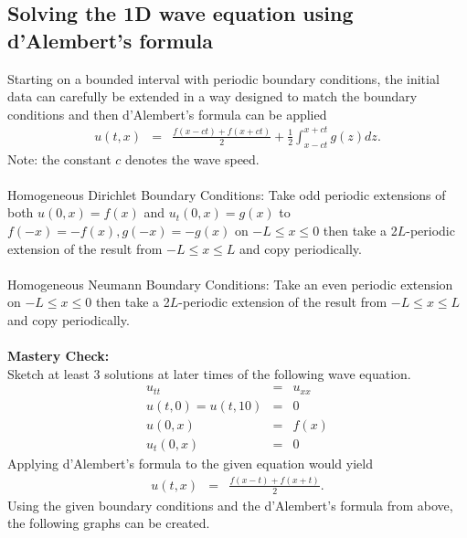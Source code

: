 \documentclass{article}
\newcommand{\bea}{\begin{eqnarray*}}
\newcommand{\eea}{\end{eqnarray*}}
\begin{document}
\subsection{Solving the 1D wave equation using d'Alembert's formula}
Starting on a bounded interval with periodic boundary conditions, the initial data can carefully be extended in a way designed to match the boundary conditions and then d'Alembert's formula can be applied
\bea
u(t,x) &=& \frac{f(x-ct)+f(x+ct)}{2}+\frac{1}{2}\int_{x-ct}^{x+ct}{g(z)dz}.
\eea
Note: the constant $c$ denotes the wave speed.\\\\
Homogeneous Dirichlet Boundary Conditions: Take odd periodic extensions of both $u(0,x)=f(x)$ and $u_t(0,x)=g(x)$ to $f(-x) = -f(x), g(-x) = -g(x)$ on $-L \leq x \leq 0$ then take a 2$L$-periodic extension of the result from $-L \leq x \leq L$ and copy periodically.\\\\
Homogeneous Neumann Boundary Conditions: Take an even periodic extension on $-L \leq x \leq 0$ then take a 2$L$-periodic extension of the result from $-L \leq x \leq L$ and copy periodically.\\\\
\textbf{Mastery Check:}\\
Sketch at least 3 solutions at later times of the following wave equation.
\bea
u_{tt} &=& u_{xx}\\
u(t,0) = u(t,10) &=& 0\\
u(0,x) &=& f(x)\\
u_t(0,x) &=& 0
\eea
Applying d'Alembert's formula to the given equation would yield
\bea
u(t,x) &=& \frac{f(x-t)+f(x+t)}{2}.
\eea
Using the given boundary conditions and the d'Alembert's formula from above, the following graphs can be created.
\end{document}
